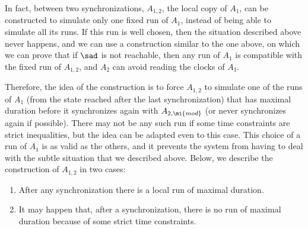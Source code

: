 \documentclass{LMCS}
\theoremstyle{plain}\newtheorem*{prop11}{Proposition~\ref{prop:states} bis}
\begin{document}
In fact, between two synchronizations,
$A_{1,2}$, the local copy of $A_1$, can be constructed to simulate
only one fixed run of $A_1$, instead of being able to simulate all its runs.
If this run is well chosen, then the situation described above never happens,
and we can use a construction similar to the one above, on which we can prove that
if $\sad$ is not reachable, then any run of $A_1$ is compatible with the
fixed run of $A_{1,2}$, and $A_2$ can avoid reading the clocks of $A_1$.

Therefore, the idea of the construction is to force $A_{1,2}$ to simulate one
of the runs of $A_1$ (from the state reached after
the last synchronization) that has maximal duration before it synchronizes again
with $A_{2,\mi{mod}}$ (or never synchronizes again if
possible). There may not be any
  such run if some time constraints are strict inequalities, but the idea can be
  adapted even to this case.
This choice of a run of $A_1$ is as valid as the others, and it
prevents the system from having to deal with the subtle situation that we described
above.
Below, we describe the construction of $A_{1,2}$ in two cases:
\begin{enumerate}
  \item After any synchronization there is a local run of maximal duration.
  \item It may happen that, after a synchronization, there is no
    run of maximal duration because of some strict time constraints.
\end{enumerate}
\end{document}
